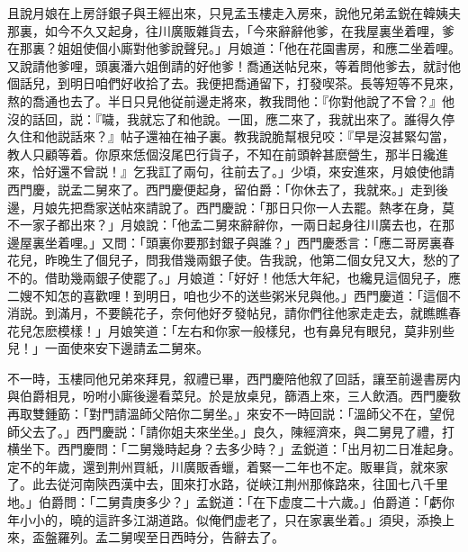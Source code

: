 且說月娘在上房㧱銀子與王經出來，只見孟玉樓走入房來，說他兄弟孟鋭在韓姨夫那裏，如今不久又起身，往川廣販雜貨去，「今來辭辭他爹，在我屋裏坐着哩，爹在那裏？姐姐使個小廝對他爹說聲兒。」月娘道：「他在花園書房，和應二坐着哩。又說請他爹哩，頭裏潘六姐倒請的好他爹！喬通送帖兒來，等着問他爹去，就討他個話兒，到明日咱們好收拾了去。我便把喬通留下，打發喫茶。長等短等不見來，熬的喬通也去了。半日只見他従前邊走將來，教我問他：『你對他說了不曾？』他沒的話回，説：『噦，我就忘了和他說。一囬，應二來了，我就出來了。誰得久停久住和他説話來？』帖子還袖在袖子裏。教我說脆幫根兒咬：『早是沒甚緊勾當，教人只顧等着。你原來恁個沒尾巴行貨子，不知在前頭幹甚麽營生，那半日纔進來，恰好還不曾説！』乞我訌了兩句，往前去了。」少頃，來安進來，月娘使他請西門慶，説孟二舅來了。西門慶便起身，留伯爵：「你休去了，我就來。」走到後邊，月娘先把喬家送帖來請說了。西門慶說：「那日只你一人去罷。熱孝在身，莫不一家子都出來？」月娘說：「他孟二舅來辭辭你，一兩日起身往川廣去也，在那邊屋裏坐着哩。」又問：「頭裏你要那封銀子與誰？」西門慶悉言：「應二哥房裏春花兒，昨晚生了個兒子，問我借幾兩銀子使。告我說，他第二個女兒又大，愁的了不的。借助幾兩銀子使罷了。」月娘道：「好好！他恁大年紀，也纔見這個兒子，應二嫂不知怎的喜歡哩！到明日，咱也少不的送些粥米兒與他。」西門慶道：「這個不消説。到滿月，不要饒花子，奈何他好歹發帖兒，請你們往他家走走去，就瞧瞧春花兒怎麽模樣！」月娘笑道：「左右和你家一般樣兒，也有鼻兒有眼兒，莫非别些兒！」一面使來安下邊請孟二舅來。

不一時，玉樓同他兄弟來拜見，叙禮已畢，西門慶陪他叙了回話，讓至前邊書房内與伯爵相見，吩咐小廝後邊看菜兒。於是放桌兒，篩酒上來，三人飲酒。西門慶敎再取雙鍾筯：「對門請溫師父陪你二舅坐。」來安不一時回説：「溫師父不在，望倪師父去了。」西門慶説：「請你姐夫來坐坐。」良久，陳經濟來，與二舅見了禮，打横坐下。西門慶問：「二舅幾時起身？去多少時？」孟鋭道：「出月初二日准起身。定不的年歲，還到荆州買紙，川廣販香蠟，着緊一二年也不定。販畢貨，就來家了。此去従河南陝西漢中去，囬來打水路，従峽江荆州那條路來，往囬七八千里地。」伯爵問：「二舅貴庚多少？」孟鋭道：「在下虚度二十六歲。」伯爵道：「虧你年小小的，曉的這許多江湖道路。似俺們虚老了，只在家裏坐着。」須臾，添換上來，盃盤羅列。孟二舅喫至日西時分，告辭去了。

